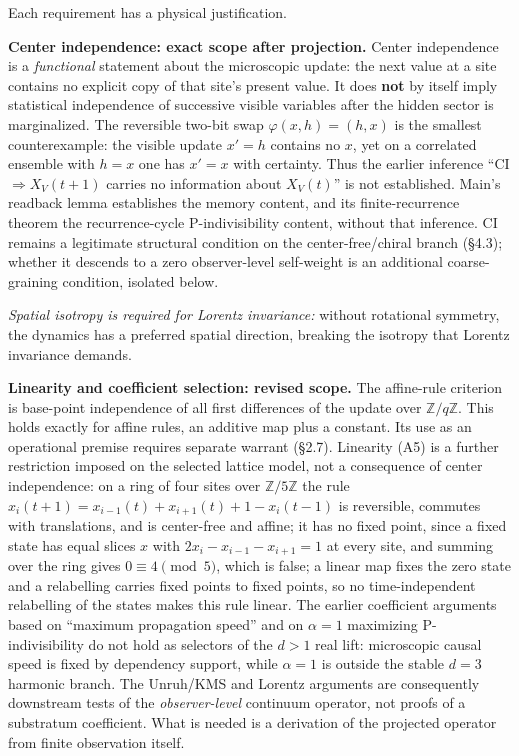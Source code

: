 \documentclass[
]{article}
\begin{document}
Each requirement has a physical justification.

\textbf{Center independence: exact scope after projection.} Center
independence is a \emph{functional} statement about the microscopic
update: the next value at a site contains no explicit copy of that
site's present value. It does \textbf{not} by itself imply statistical
independence of successive visible variables after the hidden sector is
marginalized. The reversible two-bit swap \(\varphi(x,h)=(h,x)\) is the
smallest counterexample: the visible update \(x'=h\) contains no \(x\),
yet on a correlated ensemble with \(h=x\) one has \(x'=x\) with
certainty. Thus the earlier inference ``CI \(\Rightarrow X_V(t+1)\)
carries no information about \(X_V(t)\)'' is not established. Main's
readback lemma establishes the memory content, and its finite-recurrence
theorem the recurrence-cycle P-indivisibility content, without that
inference. CI remains a legitimate structural condition on the
center-free/chiral branch (§4.3); whether it descends to a zero
observer-level self-weight is an additional coarse-graining condition,
isolated below.

\emph{Spatial isotropy is required for Lorentz invariance:} without
rotational symmetry, the dynamics has a preferred spatial direction,
breaking the isotropy that Lorentz invariance demands.

\textbf{Linearity and coefficient selection: revised scope.} The
affine-rule criterion is base-point independence of all first
differences of the update over \(\mathbb{Z}/q\mathbb{Z}\). This holds
exactly for affine rules, an additive map plus a constant. Its use as an
operational premise requires separate warrant (§2.7). Linearity (A5) is
a further restriction imposed on the selected lattice model, not a
consequence of center independence: on a ring of four sites over
\(\mathbb{Z}/5\mathbb{Z}\) the rule
\(x_i(t+1)=x_{i-1}(t)+x_{i+1}(t)+1-x_i(t-1)\) is reversible, commutes
with translations, and is center-free and affine; it has no fixed point,
since a fixed state has equal slices \(x\) with
\(2x_i-x_{i-1}-x_{i+1}=1\) at every site, and summing over the ring
gives \(0\equiv4 \pmod 5\), which is false; a linear map fixes the zero
state and a relabelling carries fixed points to fixed points, so no
time-independent relabelling of the states makes this rule linear. The
earlier coefficient arguments based on ``maximum propagation speed'' and
on \(\alpha=1\) maximizing P-indivisibility do not hold as selectors of
the \(d>1\) real lift: microscopic causal speed is fixed by dependency
support, while \(\alpha=1\) is outside the stable \(d=3\) harmonic
branch. The Unruh/KMS and Lorentz arguments are consequently downstream
tests of the \emph{observer-level} continuum operator, not proofs of a
substratum coefficient. What is needed is a derivation of the projected
operator from finite observation itself.
\end{document}

